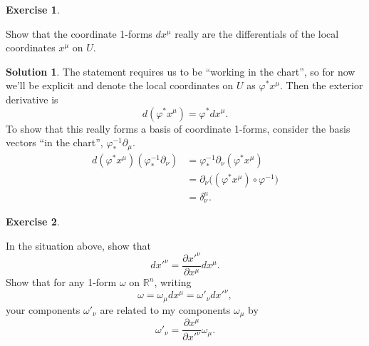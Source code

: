 \documentclass[11pt, a4paper]{report}
\theoremstyle{definition}
\newtheorem{exercise}{Exercise}[part]
\newtheorem{solution}{Solution}[part]
\newenvironment{ex}{\begin{exercise}}{\end{exercise}\pagebreak[1]}
\newenvironment{sol}{\begin{solution}}{\end{solution}\pagebreak[3]}
\begin{document}
\begin{ex}\label{ex:coordinatetransformation1form}

Show that the coordinate 1-forms $dx^\mu$ really are the differentials of the local coordinates $x^\mu$ on $U$.

\end{ex}

\begin{sol}

The statement requires us to be ``working in the chart'', so for now we'll be explicit and denote the local coordinates on $U$ as $\varphi^*x^\mu$. Then the exterior derivative is
\[
    d(\varphi^*x^\mu) = \varphi^* dx^\mu.
\]
To show that this really forms a basis of coordinate 1-forms, consider the basis vectors ``in the chart'', $\varphi_*^{-1}\partial_\mu$.
\begin{align*}
    d(\varphi^* x^\mu)(\varphi_*^{-1}\partial_\nu) &= \varphi_*^{-1}\partial_\nu (\varphi^* x^\mu) \\
        &= \partial_\nu \bigl( (\varphi^* x^\mu) \circ \varphi^{-1} \bigr) \\
        &= \delta_\nu^\mu.
\end{align*}

\end{sol}

\begin{ex}\label{ex:transform1form}

In the situation above, show that
\[
    dx'^\nu = \frac{\partial x'^\nu}{\partial x^\mu} dx^\mu.
\]
Show that for any 1-form $\omega$ on $\mathbb{R}^n$, writing
\[
    \omega = \omega_\mu dx^\mu = \omega'_\nu dx'^\nu,
\]
your components $\omega'_\nu$ are related to my components $\omega_\mu$ by
\[
    \omega'_\nu = \frac{\partial x^\mu}{\partial x'^\nu} \omega_\mu.
\]

\end{ex}
\end{document}

